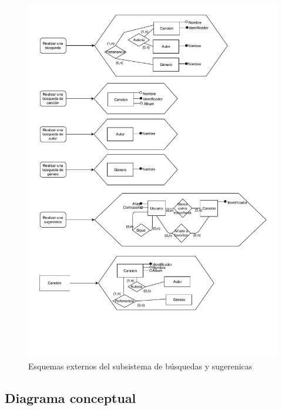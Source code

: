 \begin{figure}[H]
  \caption{Esquemas externos del subsistema de búsquedas y sugerenicas}
  \centering
  \includegraphics[scale=0.8]{diagramas/busqueda_esquema_externo.pdf}
\end{figure}

\subsection{Diagrama conceptual}


